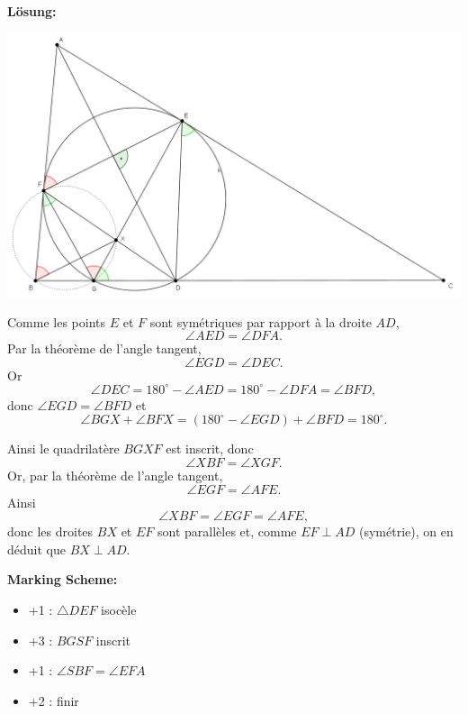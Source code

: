 \documentclass[language=german,style=solution]{smo}
\begin{document}
\begin{enumerate}
\textbf{Lösung:}

\includegraphics[width=\textwidth+1cm]{muloe_2016_aufgabe5.png}

Comme les points $E$ et $F$ sont symétriques par rapport à la droite $AD$,
\[
\angle AED = \angle DFA.
\]
Par la théorème de l'angle tangent,
\[
\angle EGD = \angle DEC.
\]
Or 
\[
\angle DEC = 180^{\circ}-\angle AED = 180^{\circ} - \angle DFA = \angle BFD,
\]
donc $\angle EGD = \angle BFD$ et
\[
\angle BGX + \angle BFX = (180^{\circ} - \angle EGD) + \angle BFD = 180^{\circ}.
\]

Ainsi le quadrilatère $BGXF$ est inscrit, donc
\[
\angle XBF = \angle XGF.
\]
Or, par la théorème de l'angle tangent,
\[
\angle EGF = \angle AFE.
\]
Ainsi
\[
\angle XBF = \angle EGF = \angle AFE,
\]
donc les droites $BX$ et $EF$ sont parallèles et, comme $EF\perp AD$ (symétrie), on en déduit que $BX\perp AD$.

\textbf{Marking Scheme:}

\begin{itemize}
\item +1 : $\triangle DEF$ isocèle
\item +3 : $BGSF$ inscrit
\item +1 : $\angle SBF = \angle EFA$
\item +2 : finir
\end{itemize}

\end{enumerate}
\end{document}
